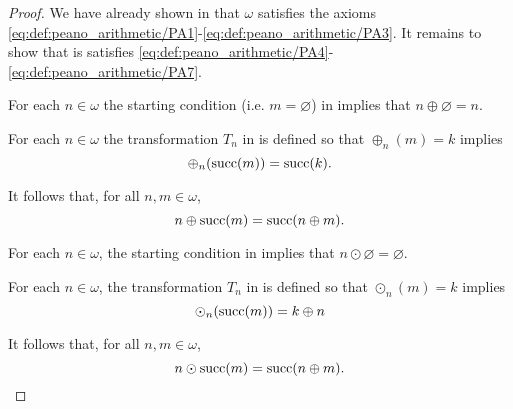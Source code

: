 \begin{proof}
  We have already shown in  that \( \omega \) satisfies the axioms \eqref{eq:def:peano_arithmetic/PA1}-\eqref{eq:def:peano_arithmetic/PA3}. It remains to show that is satisfies \eqref{eq:def:peano_arithmetic/PA4}-\eqref{eq:def:peano_arithmetic/PA7}.

   For each \( n \in \omega \) the starting condition (i.e. \( m = \varnothing \)) in  implies that \( n \oplus \varnothing = n \).

   For each \( n \in \omega \) the transformation \( T_n \) in  is defined so that \( \oplus_n(m) = k \) implies
  \begin{equation*}
    \oplus_n(\operatorname{succ}(m)) = \operatorname{succ}(k).
  \end{equation*}

  It follows that, for all \( n, m \in \omega \),
  \begin{equation*}
    n \oplus \operatorname{succ}(m) = \operatorname{succ}(n \oplus m).
  \end{equation*}

   For each \( n \in \omega \), the starting condition in  implies that \( n \odot \varnothing = \varnothing \).

   For each \( n \in \omega \), the transformation \( T_n \) in  is defined so that \( \odot_n(m) = k \) implies
  \begin{equation*}
    \odot_n(\operatorname{succ}(m)) = k \oplus n
  \end{equation*}

  It follows that, for all \( n, m \in \omega \),
  \begin{equation*}
    n \odot \operatorname{succ}(m) = \operatorname{succ}(n \oplus m).
  \end{equation*}
\end{proof}

